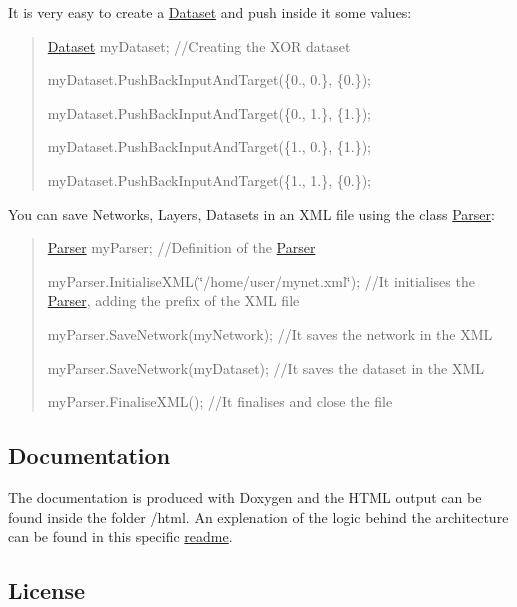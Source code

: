 It is very easy to create a \hyperlink{class_dataset}{Dataset} and push inside it some values\-:

\begin{quotation}
\hyperlink{class_dataset}{Dataset} my\-Dataset; //\-Creating the X\-O\-R dataset

my\-Dataset.\-Push\-Back\-Input\-And\-Target(\{0., 0.\}, \{0.\});

my\-Dataset.\-Push\-Back\-Input\-And\-Target(\{0., 1.\}, \{1.\});

my\-Dataset.\-Push\-Back\-Input\-And\-Target(\{1., 0.\}, \{1.\});

my\-Dataset.\-Push\-Back\-Input\-And\-Target(\{1., 1.\}, \{0.\});

\end{quotation}


You can save Networks, Layers, Datasets in an X\-M\-L file using the class \hyperlink{class_parser}{Parser}\-:

\begin{quotation}
\hyperlink{class_parser}{Parser} my\-Parser; //\-Definition of the \hyperlink{class_parser}{Parser}

my\-Parser.\-Initialise\-X\-M\-L(\char`\"{}/home/user/mynet.\-xml\char`\"{}); //\-It initialises the \hyperlink{class_parser}{Parser}, adding the prefix of the X\-M\-L file

my\-Parser.\-Save\-Network(my\-Network); //\-It saves the network in the X\-M\-L

my\-Parser.\-Save\-Network(my\-Dataset); //\-It saves the dataset in the X\-M\-L

my\-Parser.\-Finalise\-X\-M\-L(); //\-It finalises and close the file

\end{quotation}


\subsection*{Documentation }

The documentation is produced with Doxygen and the H\-T\-M\-L output can be found inside the folder /html. An explenation of the logic behind the architecture can be found in this specific \hyperlink{md__a_r_c_h_i_t_e_c_t_u_r_e}{readme}.

\subsection*{License }

